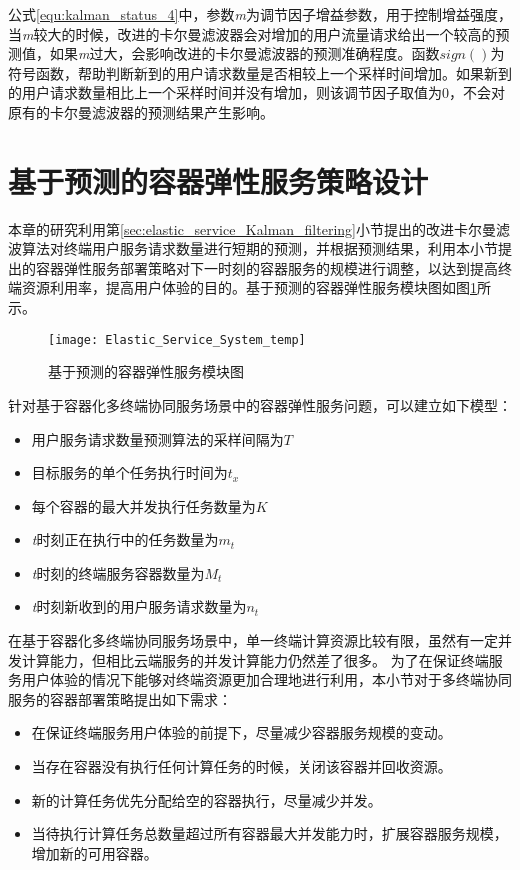 公式\ref{equ:kalman_status_4}中，参数\emph{m}为调节因子增益参数，用于控制增益强度，当\emph{m}较大的时候，改进的卡尔曼滤波器会对增加的用户流量请求给出一个较高的预测值，如果\emph{m}过大，会影响改进的卡尔曼滤波器的预测准确程度。函数$sign()$为符号函数，帮助判断新到的用户请求数量是否相较上一个采样时间增加。如果新到的用户请求数量相比上一个采样时间并没有增加，则该调节因子取值为0，不会对原有的卡尔曼滤波器的预测结果产生影响。


\section{基于预测的容器弹性服务策略设计}\label{sec:elastic_service_strategy}

本章的研究利用第\ref{sec:elastic_service_Kalman_filtering}小节提出的改进卡尔曼滤波算法对终端用户服务请求数量进行短期的预测，并根据预测结果，利用本小节提出的容器弹性服务部署策略对下一时刻的容器服务的规模进行调整，以达到提高终端资源利用率，提高用户体验的目的。基于预测的容器弹性服务模块图如图\ref{fig:elastic_service_system}所示。

\begin{figure}[htbp]
    \centering
    \texttt{[image: Elastic\_Service\_System\_temp]}\hfill\\[0.5cm]
  \caption{基于预测的容器弹性服务模块图}
  \label{fig:elastic_service_system}
\end{figure}

针对基于容器化多终端协同服务场景中的容器弹性服务问题，可以建立如下模型：
\begin{itemize}
    \item 用户服务请求数量预测算法的采样间隔为$T$
    \item 目标服务的单个任务执行时间为$t_x$
    \item 每个容器的最大并发执行任务数量为$K$
    \item \emph{t}时刻正在执行中的任务数量为$m_t$
    \item \emph{t}时刻的终端服务容器数量为$M_t$
    \item \emph{t}时刻新收到的用户服务请求数量为$n_t$
\end{itemize}

在基于容器化多终端协同服务场景中，单一终端计算资源比较有限，虽然有一定并发计算能力，但相比云端服务的并发计算能力仍然差了很多。
为了在保证终端服务用户体验的情况下能够对终端资源更加合理地进行利用，本小节对于多终端协同服务的容器部署策略提出如下需求：
\begin{itemize}
    \item 在保证终端服务用户体验的前提下，尽量减少容器服务规模的变动。
    \item 当存在容器没有执行任何计算任务的时候，关闭该容器并回收资源。
    \item 新的计算任务优先分配给空的容器执行，尽量减少并发。
    \item 当待执行计算任务总数量超过所有容器最大并发能力时，扩展容器服务规模，增加新的可用容器。
\end{itemize}

